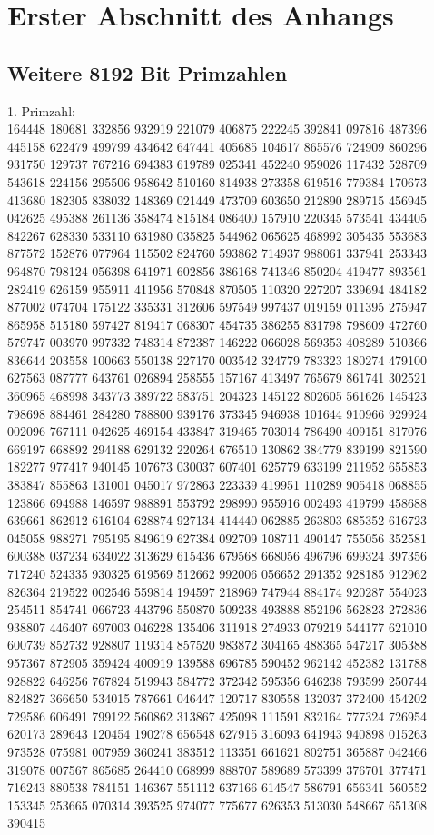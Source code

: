 \chapter{Erster Abschnitt des Anhangs}
\section*{Weitere 8192 Bit Primzahlen} 
1. Primzahl: \\
164448 180681 332856 932919 221079 406875 222245 392841 097816 487396 445158 622479 499799 434642 647441 405685 104617 865576 724909 860296 931750 129737 767216 694383 619789 025341 452240 959026 117432 528709 543618 224156 295506 958642 510160 814938 273358 619516 779384 170673 413680 182305 838032 148369 021449 473709 603650 212890 289715 456945 042625 495388 261136 358474 815184 086400 157910 220345 573541 434405 842267 628330 533110 631980 035825 544962 065625 468992 305435 553683 877572 152876 077964 115502 824760 593862 714937 988061 337941 253343 964870 798124 056398 641971 602856 386168 741346 850204 419477 893561 282419 626159 955911 411956 570848 870505 110320 227207 339694 484182 877002 074704 175122 335331 312606 597549 997437 019159 011395 275947 865958 515180 597427 819417 068307 454735 386255 831798 798609 472760 579747 003970 997332 748314 872387 146222 066028 569353 408289 510366 836644 203558 100663 550138 227170 003542 324779 783323 180274 479100 627563 087777 643761 026894 258555 157167 413497 765679 861741 302521 360965 468998 343773 389722 583751 204323 145122 802605 561626 145423 798698 884461 284280 788800 939176 373345 946938 101644 910966 929924 002096 767111 042625 469154 433847 319465 703014 786490 409151 817076 669197 668892 294188 629132 220264 676510 130862 384779 839199 821590 182277 977417 940145 107673 030037 607401 625779 633199 211952 655853 383847 855863 131001 045017 972863 223339 419951 110289 905418 068855 123866 694988 146597 988891 553792 298990 955916 002493 419799 458688 639661 862912 616104 628874 927134 414440 062885 263803 685352 616723 045058 988271 795195 849619 627384 092709 108711 490147 755056 352581 600388 037234 634022 313629 615436 679568 668056 496796 699324 397356 717240 524335 930325 619569 512662 992006 056652 291352 928185 912962 826364 219522 002546 559814 194597 218969 747944 884174 920287 554023 254511 854741 066723 443796 550870 509238 493888 852196 562823 272836 938807 446407 697003 046228 135406 311918 274933 079219 544177 621010 600739 852732 928807 119314 857520 983872 304165 488365 547217 305388 957367 872905 359424 400919 139588 696785 590452 962142 452382 131788 928822 646256 767824 519943 584772 372342 595356 646238 793599 250744 824827 366650 534015 787661 046447 120717 830558 132037 372400 454202 729586 606491 799122 560862 313867 425098 111591 832164 777324 726954 620173 289643 120454 190278 656548 627915 316093 641943 940898 015263 973528 075981 007959 360241 383512 113351 661621 802751 365887 042466 319078 007567 865685 264410 068999 888707 589689 573399 376701 377471 716243 880538 784151 146367 551112 637166 614547 586791 656341 560552 153345 253665 070314 393525 974077 775677 626353 513030 548667 651308 390415 
